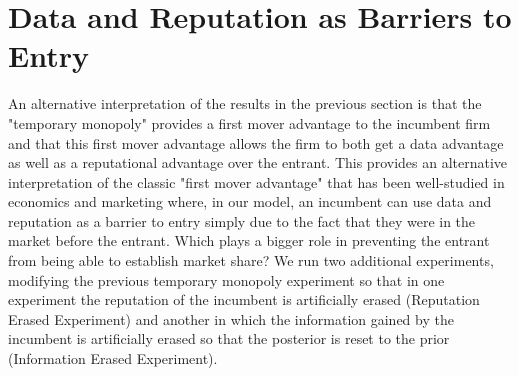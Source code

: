 \documentclass[../competing_bandits.tex]{subfiles}
\begin{document}
\section{Data and Reputation as Barriers to Entry}\label{section:6}

An alternative interpretation of the results in the previous section is that the "temporary monopoly" provides a first mover advantage to the incumbent firm and that this first mover advantage allows the firm to both get a data advantage as well as a reputational advantage over the entrant. This provides an alternative interpretation of the classic "first mover advantage" that has been well-studied in economics and marketing \cite{kerin1992first} where, in our model, an incumbent can use data and reputation as a barrier to entry simply due to the fact that they were in the market before the entrant. Which plays a bigger role in preventing the entrant from being able to establish market share? We run two additional experiments, modifying the previous temporary monopoly experiment so that in one experiment the reputation of the incumbent is artificially erased (Reputation Erased Experiment) and another in which the information gained by the incumbent is artificially erased so that the posterior is reset to the prior (Information Erased Experiment).
\end{document}
